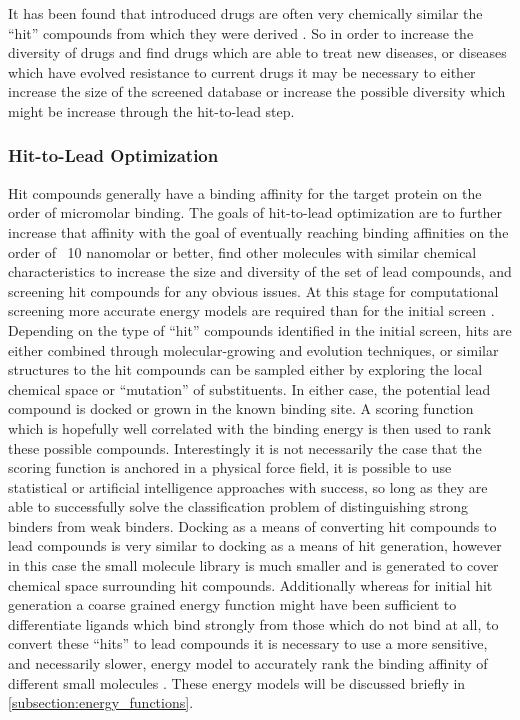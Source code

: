 It has been found that introduced drugs are often very chemically similar the ``hit'' compounds from which they were derived \cite{proudfoot2002drugs}.
So in order to increase the diversity of drugs and find drugs which are able to treat new diseases, or diseases which have evolved resistance to current drugs it may be necessary to either increase the size of the screened database or increase the possible diversity which might be increase through the hit-to-lead step.


\subsubsection{Hit-to-Lead Optimization}
\label{subsubsection:hit_to_lead}
Hit compounds generally have a binding affinity for the target protein on the order of micromolar binding.
The goals of hit-to-lead optimization are to further increase that affinity with the goal of eventually reaching binding affinities on the order of ~10 nanomolar or better, find other molecules with similar chemical characteristics to increase the size and diversity of the set of lead compounds, and screening hit compounds for any obvious issues.
At this stage for computational screening more accurate energy models are required than for the initial screen \cite{jorgensen2004many,gohlke2002approaches,jorgensen2009efficient}.
Depending on the type of ``hit'' compounds identified in the initial screen, hits are either combined through molecular-growing and evolution techniques, or similar structures to the hit compounds can be sampled either by exploring the local chemical space or ``mutation'' of substituents.
In either case, the potential lead compound is docked or grown in the known binding site.
A scoring function which is hopefully well correlated with the binding energy is then used to rank these possible compounds.
Interestingly it is not necessarily the case that the scoring function is anchored in a physical force field, it is possible to use statistical or artificial intelligence approaches with success, so long as they are able to successfully solve the classification problem of distinguishing strong binders from weak binders.
Docking as a means of converting hit compounds to lead compounds is very similar to docking as a means of hit generation, however in this case the small molecule library is much smaller and is generated to cover chemical space surrounding hit compounds.
Additionally whereas for initial hit generation a coarse grained energy function might have been sufficient to differentiate ligands which bind strongly from those which do not bind at all, to convert these ``hits'' to lead compounds it is necessary to use a more sensitive, and necessarily slower, energy model to accurately rank the binding affinity of different small molecules \cite{jorgensen2004many,gohlke2002approaches}.
These energy models will be discussed briefly in \ref{subsection:energy_functions}.


